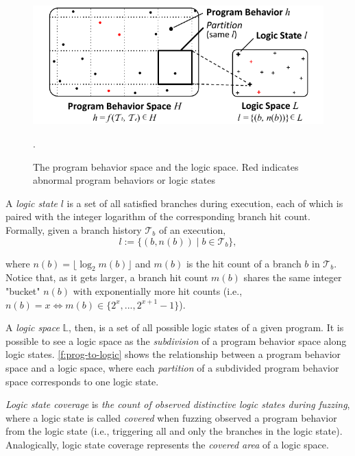 \documentclass[letterpaper,twocolumn,10pt]{article}
\begin{document}
\begin{figure}[t]
  \centering
  \includegraphics[width=\columnwidth]{images/prog-to-logic.pdf}
  \caption{The program behavior space and the logic space. Red indicates
  abnormal program behaviors or logic states}.
  \label{f:prog-to-logic}
\end{figure}

%
A \emph{logic state} $l$ is a set of all satisfied branches during execution,
each of which is paired with the integer logarithm of the corresponding branch
hit count. Formally, given a branch history $\mathcal{T}_b$ of an execution,
%
\begin{equation}
\label{e:ls}
  l := \{(b, n(b)) \mid b \in \mathcal{T}_b\},
\end{equation}

\noindent where $n(b) = \lfloor \log_2{m(b)} \rfloor$ and $m(b)$ is the hit
count of a branch $b$ in $\mathcal{T}_b$.  Notice that, as it gets larger, a
branch hit count $m(b)$ shares the same integer "bucket" $n(b)$ with
exponentially more hit counts (i.e., $n(b)=x \iff m(b) \in \{2^x, ...,
2^{x+1}-1\}$).

A \emph{logic space} $\mathbb{L}$, then, is a set of all possible logic states
of a given program. 
%
It is possible to see a logic space as the \emph{subdivision} of a program
behavior space along logic states. \autoref{f:prog-to-logic} shows the
relationship between a program behavior space and a logic space, where each
\emph{partition} of a subdivided program behavior space corresponds to one logic
state. 


%
\emph{Logic state coverage} is \emph{the count of observed distinctive logic
states during fuzzing}, where a logic state is called \emph{covered} when
fuzzing observed a program behavior from the logic state (i.e., triggering all
and only the branches in the logic state). 
%
Analogically, logic state coverage represents the \emph{covered area} of a logic
space.
\end{document}
